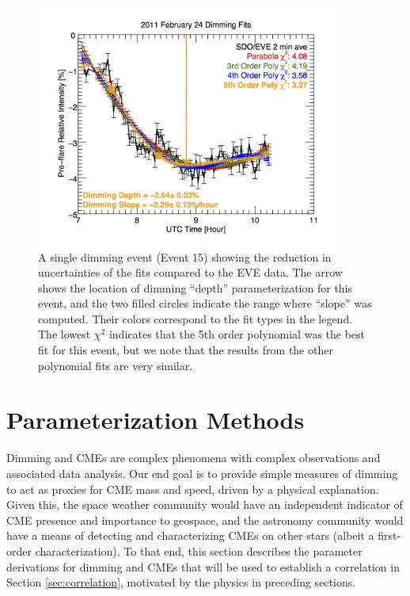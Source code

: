 \begin{figure}[!h]
    \begin{center}
	    \includegraphics[width=100mm]{Images/DimmingFitsExample.png}
    \end{center}
    \caption[Dimming fits example]{
        A single dimming event (Event 15) showing the reduction in uncertainties of the fits compared to the EVE data. The
        arrow shows the location of dimming “depth” parameterization for this event, and the two filled circles indicate the 
        range where “slope” was computed. Their colors correspond to the fit types in the legend. The lowest $\chi^2$ indicates 
        that the 5th order polynomial was the best fit for this event, but we note that the results from the other 
        polynomial fits are very similar.
   	}
    \label{fig:fitsexample}
\end{figure}

\section{Parameterization Methods}
\label{sec:parameterization}
Dimming and CMEs are complex phenomena with complex observations and associated data analysis. Our end goal is to provide simple measures of dimming to act as proxies for CME mass and speed, driven by a physical explanation. Given this, the space weather community would have an independent indicator of CME presence and importance to geospace, and the astronomy community would have a means of detecting and characterizing CMEs on other stars (albeit a first-order characterization). To that end, this section describes the parameter derivations for dimming and CMEs that will be used to establish a correlation in Section \ref{sec:correlation}, motivated by the physics in preceding sections. 

